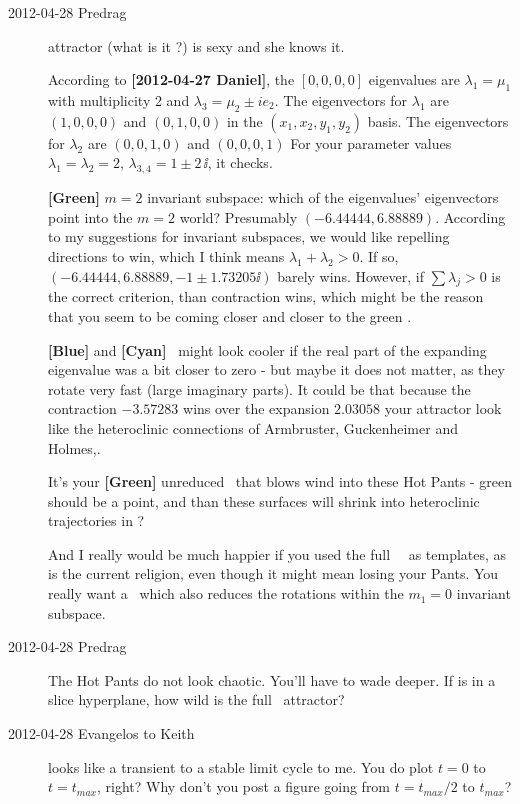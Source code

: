 \begin{description}
\item[2012-04-28 Predrag]  attractor (what is it ?) is sexy and she
knows it.

According to {\bf [2012-04-27 Daniel]},
the $[0,0,0,0]$ eigenvalues are $\lambda_1 = \mu_1$ with multiplicity 2 and
             $\lambda_3 = \mu_2 \pm i e_2$. The eigenvectors for
             $\lambda_1$ are $(1,0,0,0)$ and $(0,1,0,0)$ in the
             $(x_1,x_2,y_1,y_2)$ basis.
             The eigenvectors for
             $\lambda_2$ are $(0,0,1,0)$ and $(0,0,0,1)$
For your parameter values
             $\lambda_1 = \lambda_2= 2$,
             $\lambda_{3,4} = 1 \pm  2\,\ii$, it checks.

{\bf [Green]} $m=2$ invariant subspace: which of the eigenvalues' eigenvectors
    point into the $m=2$ world? Presumably $(-6.44444,6.88889)$.
    According to my suggestions for invariant subspaces, we would like
    repelling directions to win, which I think means $\lambda_1+\lambda_2
    >0$. If so, $(-6.44444,6.88889,-1 \pm 1.73205\ii)$ barely wins.
    However, if $\sum \lambda_j >0$ is the correct criterion, than contraction
    wins, which might be the reason that you seem to be coming closer and
    closer to the green \rpo.

{\bf [Blue]} and {\bf [Cyan]} \eqva\ might look cooler if the real part
of the expanding eigenvalue was a bit closer to zero - but maybe it does
not matter, as they rotate very fast (large imaginary parts). It could be
that because the contraction $-3.57283$ wins over the expansion $2.03058$
your attractor look like the heteroclinic connections of Armbruster,
Guckenheimer and Holmes,.

It's your {\bf [Green]} unreduced \rpo\ that blows wind into these Hot
Pants - green should be a point, and than these surfaces will shrink into
heteroclinic trajectories in \reducedsp?

And I really would be much happier if you used the full \statesp\ \eqva\
as templates, as is the current religion, even though it might mean
losing your Pants.  You really want a \slice\ which also reduces the
rotations within the $m_1=0$ invariant subspace.

\item[2012-04-28 Predrag] The Hot Pants do not look chaotic.  You'll have
to wade deeper. If \reffig{fig:2moderedmultieq} is in a slice hyperplane,
how wild is the full \statesp\ attractor?

\item[2012-04-28 Evangelos to Keith]  looks like a transient
to a stable limit cycle to me. You do plot $t=0$ to $t=t_{max}$, right? Why don't
you post a figure going from $t=t_{max}/2$ to $t_{max}$?


\end{description}
